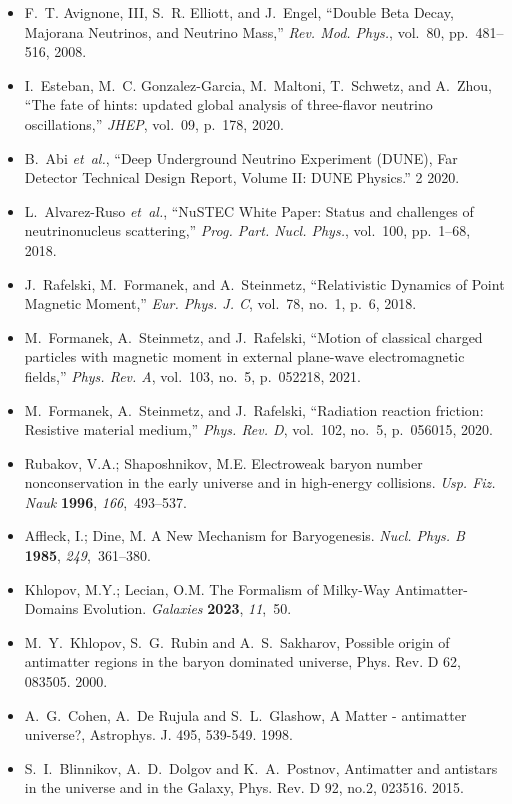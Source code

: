 \documentclass[a4paper, 10pt]{letter}
\begin{document}
\begin{letter}
\begin{itemize}
    \item F.~T. Avignone, III, S.~R. Elliott, and J.~Engel, ``{Double Beta Decay, Majorana Neutrinos, and Neutrino Mass},'' {\em Rev. Mod. Phys.}, vol.~80, pp.~481--516, 2008.
    \item I.~Esteban, M.~C. Gonzalez-Garcia, M.~Maltoni, T.~Schwetz, and A.~Zhou, ``{The fate of hints: updated global analysis of three-flavor neutrino oscillations},'' {\em JHEP}, vol.~09, p.~178, 2020.
    \item B.~Abi {\em et~al.}, ``{Deep Underground Neutrino Experiment (DUNE), Far Detector Technical Design Report, Volume II: DUNE Physics}.'' 2 2020.
    \item L.~Alvarez-Ruso {\em et~al.}, ``{NuSTEC White Paper: Status and challenges of neutrino\textendash{}nucleus scattering},'' {\em Prog. Part. Nucl. Phys.}, vol.~100, pp.~1--68, 2018.
    \item J.~Rafelski, M.~Formanek, and A.~Steinmetz, ``{Relativistic Dynamics of Point Magnetic Moment},'' {\em Eur. Phys. J. C}, vol.~78, no.~1, p.~6, 2018.
    \item M.~Formanek, A.~Steinmetz, and J.~Rafelski, ``{Motion of classical charged particles with magnetic moment in external plane-wave electromagnetic fields},'' {\em Phys. Rev. A}, vol.~103, no.~5, p.~052218, 2021.
    \item M.~Formanek, A.~Steinmetz, and J.~Rafelski, ``{Radiation reaction friction: Resistive material medium},'' {\em Phys. Rev. D}, vol.~102, no.~5, p.~056015, 2020.
    \item Rubakov, V.A.; Shaposhnikov, M.E. {Electroweak baryon number nonconservation in the early universe and  in high-energy collisions}. {\em Usp. Fiz. Nauk} {\bf 1996}, {\em 166},~493--537.
    \item Affleck, I.; Dine, M. {A New Mechanism for Baryogenesis}. {\em Nucl. Phys. B} {\bf 1985}, {\em 249},~361--380.
    \item Khlopov, M.Y.; Lecian, O.M. {The Formalism of Milky-Way Antimatter-Domains Evolution}. {\em Galaxies} {\bf 2023}, {\em 11},~50.
    \item M.~Y.~Khlopov, S.~G.~Rubin and A.~S.~Sakharov, {Possible origin of antimatter regions in the baryon dominated universe}, Phys. Rev. D 62, 083505. 2000.
    \item A.~G.~Cohen, A.~De Rujula and S.~L.~Glashow, {A Matter - antimatter universe?}, Astrophys. J. 495, 539-549. 1998.
    \item S.~I.~Blinnikov, A.~D.~Dolgov and K.~A.~Postnov, {Antimatter and antistars in the universe and in the Galaxy}, Phys. Rev. D 92, no.2, 023516. 2015.

\end{itemize}
\end{letter}
\end{document}
